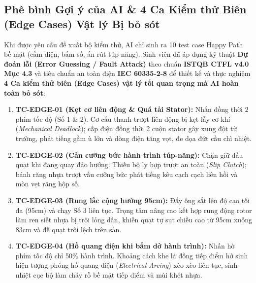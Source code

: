 \documentclass[11pt,a4paper]{article}
\begin{document}
\subsection{Phê bình Gợi ý của AI \& 4 Ca Kiểm thử Biên (Edge Cases) Vật lý Bị bỏ sót}
Khi được yêu cầu đề xuất bộ kiểm thử, AI chỉ sinh ra 10 test case Happy Path bề mặt (cắm điện, bấm số, ấn rút túp-năng). Sinh viên đã áp dụng kỹ thuật \textbf{Dự đoán lỗi (Error Guessing / Fault Attack)} theo chuẩn \textbf{ISTQB CTFL v4.0 Mục 4.3} và tiêu chuẩn an toàn điện \textbf{IEC 60335-2-8} để thiết kế và thực nghiệm \textbf{4 Ca kiểm thử biên (Edge Cases) vật lý tối quan trọng mà AI hoàn toàn bỏ sót}:
\begin{enumerate}
    \item \textbf{TC-EDGE-01 (Kẹt cơ liên động \& Quá tải Stator):} Nhấn đồng thời 2 phím tốc độ (Số 1 \& 2). Cơ cấu thanh trượt liên động bị kẹt lẫy cơ khí (\textit{Mechanical Deadlock}); cấp điện đồng thời 2 cuộn stator gây xung đột từ trường, phát tiếng gầm ù lớn và dòng điện tăng vọt, đe dọa đứt cầu chì nhiệt.
    \item \textbf{TC-EDGE-02 (Cản cưỡng bức hành trình túp-năng):} Chặn giữ đầu quạt khi đang quay đảo hướng. Thiếu bộ ly hợp trượt an toàn (\textit{Slip Clutch}); bánh răng nhựa trượt vấu cưỡng bức phát tiếng kêu cạch cạch liên hồi và mòn vẹt răng hộp số.
    \item \textbf{TC-EDGE-03 (Rung lắc cộng hưởng 95cm):} Đẩy ống sắt lên độ cao tối đa (95cm) và chạy Số 3 liên tục. Trọng tâm nâng cao kết hợp rung động rotor làm ren siết nhựa bị trôi lỏng dần, khiến quạt tự sụt chiều cao từ 95cm xuống 83cm và đế quạt trôi lệch trên sàn.
    \item \textbf{TC-EDGE-04 (Hồ quang điện khi bấm dở hành trình):} Nhấn hờ phím tốc độ chỉ 50\% hành trình. Khoảng cách khe lá đồng tiếp điểm hở sinh hiện tượng phóng hồ quang điện (\textit{Electrical Arcing}) xèo xèo liên tục, sinh nhiệt cục bộ làm cháy rỗ bề mặt tiếp điểm và mùi khét nhựa.
\end{enumerate}
\end{document}
